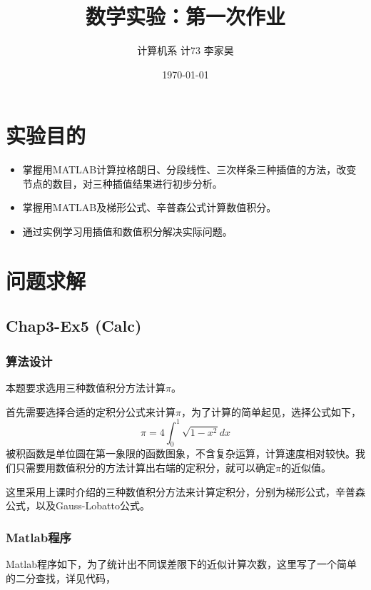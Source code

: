 \documentclass[12pt,a4paper]{article}
\title{数学实验：第一次作业}
\author{计算机系 \quad 计73 \quad 2017011620 \quad 李家昊}
\date{\today}
\begin{document}
\maketitle

\section{实验目的}

\begin{itemize}
    \item 掌握用MATLAB计算拉格朗日、分段线性、三次样条三种插值的方法，改变节点的数目，对三种插值结果进行初步分析。
    \item 掌握用MATLAB及梯形公式、辛普森公式计算数值积分。
    \item 通过实例学习用插值和数值积分解决实际问题。
\end{itemize}

\section{问题求解}

\subsection{Chap3-Ex5 (Calc)}

\subsubsection{算法设计}

本题要求选用三种数值积分方法计算$\pi$。

首先需要选择合适的定积分公式来计算$\pi$，为了计算的简单起见，选择公式如下，
\begin{equation}
    \pi = 4 \int_0^1 \sqrt{1 - x^2} dx
\end{equation}
被积函数是单位圆在第一象限的函数图象，不含复杂运算，计算速度相对较快。我们只需要用数值积分的方法计算出右端的定积分，就可以确定$\pi$的近似值。

这里采用上课时介绍的三种数值积分方法来计算定积分，分别为梯形公式，辛普森公式，以及Gauss-Lobatto公式。

\subsubsection{Matlab程序}

Matlab程序如下，为了统计出不同误差限下的近似计算次数，这里写了一个简单的二分查找，详见代码，

\end{document}
